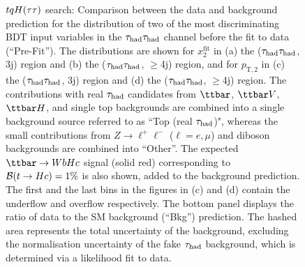 \begin{figure}[t]
\begin{center}
\caption{$tqH(\tau\tau)$ search: Comparison between the data and background prediction for the distribution of two of the most 
discriminating BDT input variables in the $\tau_{\mathrm{had}} \tau_{\mathrm{had}}$ channel before the fit to data (``Pre-Fit''). The distributions are shown for
$x_{2}^{\text{fit}}$ in (a) the ($\tau_{\mathrm{had}} \tau_{\mathrm{had}}$, 3j) region and (b) the ($\tau_{\mathrm{had}} \tau_{\mathrm{had}}$, $\geq$4j) region, and for
$p_{\text{T},2}$ in (c) the ($\tau_{\mathrm{had}} \tau_{\mathrm{had}}$, 3j)  region and (d) the ($\tau_{\mathrm{had}} \tau_{\mathrm{had}}$, $\geq$4j) region.
The contributions with real $\tau_{\mathrm{had}}$ candidates from $\ttbar$,  $\ttbar V$, $\ttbar H$, and single top backgrounds are combined into
a single background source referred to as ``Top (real $\tau_{\mathrm{had}}$)", whereas the small contributions from 
$Z\to \ell^+\ell^-$ ($\ell = e, \mu$) and diboson backgrounds are combined into ``Other''. 
The expected $\Hc$ signal (solid red) corresponding to $\mathcal{B}(t\to Hc)=1\%$ is also shown,
added to the background prediction.
The first and the last bins in the figures in (c) and (d) contain the underflow and overflow respectively.
The bottom panel displays the ratio of data to the SM background (``Bkg'') prediction.
The hashed area represents the total uncertainty of the background, excluding the normalisation uncertainty of the fake $\tau_{\mathrm{had}}$ background, 
which is determined via a likelihood fit to data.} 
\label{fig:BDT_inputs_hadhad_2}
\end{center}
\end{figure}

